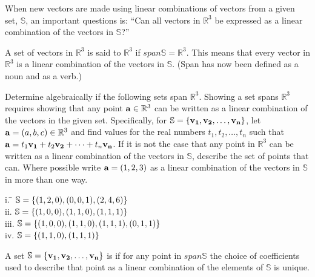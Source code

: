  When new vectors are made using linear combinations of vectors from a given set, $\mathbb{S}$, an important questions is: ``Can all vectors in $\mathbb{R}^3$ be expressed as a linear combination of the vectors in $\mathbb{S}$?''
 
 \begin{defn}
 	A set of vectors in $\mathbb{R}^3$ is said to  $\mathbb{R}^3$ if $span\mathbb{S}=\mathbb{R}^3$. This means that every vector in $\mathbb{R}^3$ is a linear combination of the vectors in $\mathbb{S}$. (Span has now been defined as a noun and as a verb.)
 \end{defn}
 
 \begin{myexc}[\bd{c}]
 	Determine algebraically if the following sets span $\mathbb{R}^3$. Showing a set spans $\mathbb{R}^3$  requires showing that any point $\mathbf{a} \in \mathbb{R}^3$ can be written as a linear combination of the vectors in the given set. Specifically, for $\mathbb{S} = \{\mathbf{v_1},\mathbf{v_2},\ldots,\mathbf{v_n}\}$, let $\mathbf{a}=({a},{b},{c})\in\mathbb{R}^3$ and find values for the real numbers $t_1,t_2,\ldots,t_n$ such that $\mathbf{a}=t_1\mathbf{v_1}+t_2\mathbf{v_2}+\cdots+t_n\mathbf{v_n}$. If it is not the case that any point in $\mathbb{R}^3$ can be written as a linear combination of the vectors in $\mathbb{S}$, describe the set of points that can. Where possible write $\mathbf{a}=({1},{2},{3})$ as a linear combination of the vectors in $\mathbb{S}$ in more than one way. 
 	 \begin{tabbing}
 	 	\indent i. \quad  \= $ \mathbb{S} =\{({1},{2},{0}),({0},{0},{1}),({2},{4},{6}) \} $\\
 	 	\indent ii. \> $ \mathbb{S} =\{({1},{0},{0}),({1},{1},{0}),({1},{1},{1}) \}$\\
 	 	\indent iii.\> $ \mathbb{S} =\{({1},{0},{0}),({1},{1},{0}),({1},{1},{1}),({0},{1},{1})\}$\\
 	 	\indent iv. \> $ \mathbb{S} =\{({1},{1},{0}),({1},{1},{1})\}$\\
 	 \end{tabbing}
 \end{myexc}
 
 \begin{defn}
 	A set $\mathbb{S} = \{\mathbf{v_1}, \mathbf{v_2}, \ldots, \mathbf{v_n} \}$ is  if for any point in $span\mathbb{S}$ the choice of coefficients used to describe that point as a linear combination of the elements of $\mathbb{S}$ is unique.
 \end{defn}
 
